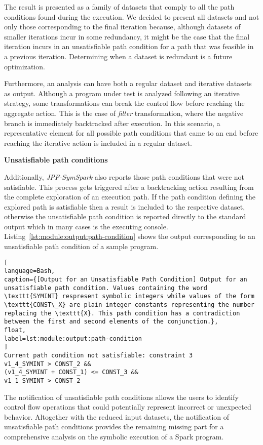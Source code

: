 The result is presented as a family of datasets that comply to all the path conditions found during the execution. We decided to present all datasets and not only those corresponding to the final iteration because, although datasets of smaller iterations incur in some redundancy, it might be the case that the final iteration incurs in an unsatisfiable path condition for a path that was feasible in a previous iteration. Determining when a dataset is redundant is a future optimization.

Furthermore, an analysis can have both a regular dataset and iterative datasets as output. Although a program under test is analyzed following an iterative strategy, some transformations can break the control flow before reaching the aggregate action. This is the case of \textit{filter} transformation, where the negative branch is immediately backtracked after execution. In this scenario, a representative element for all possible path conditions that came to an end before reaching the iterative action is included in a regular dataset.

\textbf{Unsatisfiable path conditions}

Additionally, \textit{JPF-SymSpark} also reports those path conditions that were not satisfiable. This process gets triggered after a backtracking action resulting from the complete exploration of an execution path. If the path condition defining the explored path is satisfiable then a result is included to the respective dataset, otherwise the unsatisfiable path condition is reported directly to the standard output which in many cases is the executing console. Listing~\ref{lst:module:output:path-condition} shows the output corresponding to an unsatisfiable path condition of a sample program.

\begin{lstlisting}[
language=Bash,
caption={[Output for an Unsatisfiable Path Condition] Output for an unsatisfiable path condition. Values containing the word \texttt{SYMINT} respresent symbolic integers while values of the form \texttt{CONST\_X} are plain integer constants representing the number replacing the \texttt{X}. This path condition has a contradiction between the first and second elements of the conjunction.},
float,
label=lst:module:output:path-condition
]
Current path condition not satisfiable: constraint 3
v1_4_SYMINT > CONST_2 &&
(v1_4_SYMINT + CONST_1) <= CONST_3 &&
v1_1_SYMINT > CONST_2
\end{lstlisting}

The notification of unsatisfiable path conditions allows the users to identify control flow operations that could potentially represent incorrect or unexpected behavior. Altogether with the reduced input datasets, the notification of unsatisfiable path conditions provides the remaining missing part for a comprehensive analysis on the symbolic execution of a Spark program.